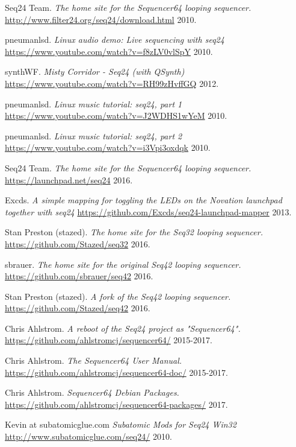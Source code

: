 \begin{thebibliography}{99}
   Seq24 Team.
   \emph{The home site for the Sequencer64 looping sequencer.}
   \url{http://www.filter24.org/seq24/download.html}
   2010.

   pneumanlsd.
   \emph{Linux audio demo: Live sequencing with seq24}
   \url{https://www.youtube.com/watch?v=f8zLV0vlSpY}
   2010.

   synthWF.
   \emph{Misty Corridor - Seq24 (with QSynth)}
   \url{https://www.youtube.com/watch?v=RH99zHvffGQ}
   2012.

   pneumanlsd.
   \emph{Linux music tutorial: seq24, part 1}
   \url{https://www.youtube.com/watch?v=J2WDHS1wYeM}
   2010.
   
   pneumanlsd.
   \emph{Linux music tutorial: seq24, part 2}
   \url{https://www.youtube.com/watch?v=i3Vpi3oxdqk}
   2010.

   Seq24 Team.
   \emph{The home site for the Sequencer64 looping sequencer.}
   \url{https://launchpad.net/seq24}
   2016.

   Excds.
   \emph{A simple mapping for toggling the LEDs on the Novation launchpad
   together with seq24}
   \url{https://github.com/Excds/seq24-launchpad-mapper}
   2013.

   Stan Preston (stazed).
   \emph{The home site for the Seq32 looping sequencer.}
   \url{https://github.com/Stazed/seq32}
   2016.

   sbrauer.
   \emph{The home site for the original Seq42 looping sequencer.}
   \url{https://github.com/sbrauer/seq42}
   2016.

   Stan Preston (stazed).
   \emph{A fork of the Seq42 looping sequencer.}
   \url{https://github.com/Stazed/seq42}
   2016.

   Chris Ahlstrom.
   \emph{A reboot of the Seq24 project as "Sequencer64".}
   \url{https://github.com/ahlstromcj/sequencer64/}
   2015-2017.

   Chris Ahlstrom.
   \emph{The Sequencer64 User Manual.}
   \url{https://github.com/ahlstromcj/sequencer64-doc/}
   2015-2017.

   Chris Ahlstrom.
   \emph{Sequencer64 Debian Packages.}
   \url{https://github.com/ahlstromcj/sequencer64-packages/}
   2017.

   Kevin at subatomicglue.com
   \emph{Subatomic Mods for Seq24 Win32}
   \url{http://www.subatomicglue.com/seq24/}
   2010.


\end{thebibliography}
